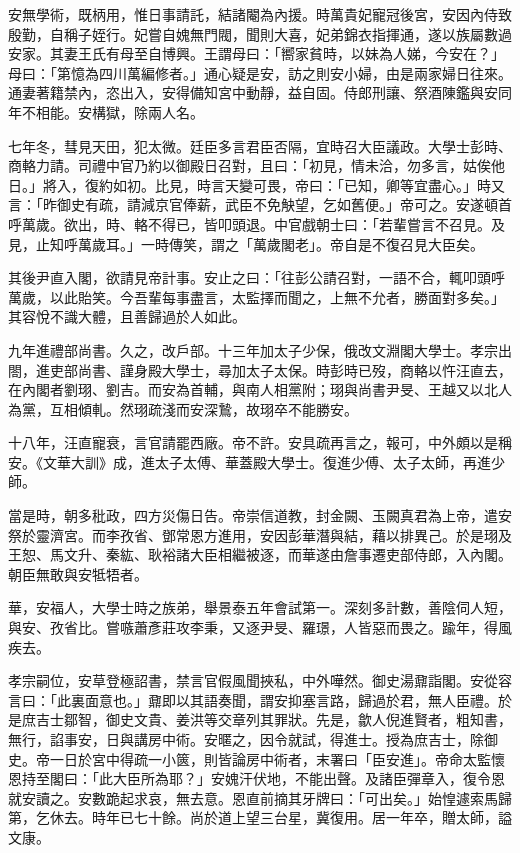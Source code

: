 \begin{pinyinscope}
安無學術，既柄用，惟日事請託，結諸閹為內援。時萬貴妃寵冠後宮，安因內侍致殷勤，自稱子姪行。妃嘗自媿無門閥，聞則大喜，妃弟錦衣指揮通，遂以族屬數過安家。其妻王氏有母至自博興。王謂母曰：「嚮家貧時，以妹為人娣，今安在？」母曰：「第憶為四川萬編修者。」通心疑是安，訪之則安小婦，由是兩家婦日往來。通妻著籍禁內，恣出入，安得備知宮中動靜，益自固。侍郎刑讓、祭酒陳鑑與安同年不相能。安構獄，除兩人名。

七年冬，彗見天田，犯太微。廷臣多言君臣否隔，宜時召大臣議政。大學士彭時、商輅力請。司禮中官乃約以御殿日召對，且曰：「初見，情未洽，勿多言，姑俟他日。」將入，復約如初。比見，時言天變可畏，帝曰：「已知，卿等宜盡心。」時又言：「昨御史有疏，請減京官俸薪，武臣不免觖望，乞如舊便。」帝可之。安遂頓首呼萬歲。欲出，時、輅不得已，皆叩頭退。中官戲朝士曰：「若輩嘗言不召見。及見，止知呼萬歲耳。」一時傳笑，謂之「萬歲閣老」。帝自是不復召見大臣矣。

其後尹直入閣，欲請見帝計事。安止之曰：「往彭公請召對，一語不合，輒叩頭呼萬歲，以此貽笑。今吾輩每事盡言，太監擇而聞之，上無不允者，勝面對多矣。」其容悅不識大體，且善歸過於人如此。

九年進禮部尚書。久之，改戶部。十三年加太子少保，俄改文淵閣大學士。孝宗出閤，進吏部尚書、謹身殿大學士，尋加太子太保。時彭時已歿，商輅以忤汪直去，在內閣者劉珝、劉吉。而安為首輔，與南人相黨附；珝與尚書尹旻、王越又以北人為黨，互相傾軋。然珝疏淺而安深鷙，故珝卒不能勝安。

十八年，汪直寵衰，言官請罷西廠。帝不許。安具疏再言之，報可，中外頗以是稱安。《文華大訓》成，進太子太傅、華蓋殿大學士。復進少傅、太子太師，再進少師。

當是時，朝多秕政，四方災傷日告。帝崇信道教，封金闕、玉闕真君為上帝，遣安祭於靈濟宮。而李孜省、鄧常恩方進用，安因彭華潛與結，藉以排異己。於是珝及王恕、馬文升、秦紘、耿裕諸大臣相繼被逐，而華遂由詹事遷吏部侍郎，入內閣。朝臣無敢與安牴牾者。

華，安福人，大學士時之族弟，舉景泰五年會試第一。深刻多計數，善陰伺人短，與安、孜省比。嘗嗾蕭彥莊攻李秉，又逐尹旻、羅璟，人皆惡而畏之。踰年，得風疾去。

孝宗嗣位，安草登極詔書，禁言官假風聞挾私，中外嘩然。御史湯鼐詣閣。安從容言曰：「此裏面意也。」鼐即以其語奏聞，謂安抑塞言路，歸過於君，無人臣禮。於是庶吉士鄒智，御史文貴、姜洪等交章列其罪狀。先是，歙人倪進賢者，粗知書，無行，諂事安，日與講房中術。安暱之，因令就試，得進士。授為庶吉士，除御史。帝一日於宮中得疏一小篋，則皆論房中術者，末署曰「臣安進」。帝命太監懷恩持至閣曰：「此大臣所為耶？」安媿汗伏地，不能出聲。及諸臣彈章入，復令恩就安讀之。安數跪起求哀，無去意。恩直前摘其牙牌曰：「可出矣。」始惶遽索馬歸第，乞休去。時年已七十餘。尚於道上望三台星，冀復用。居一年卒，贈太師，謚文康。


\end{pinyinscope}
